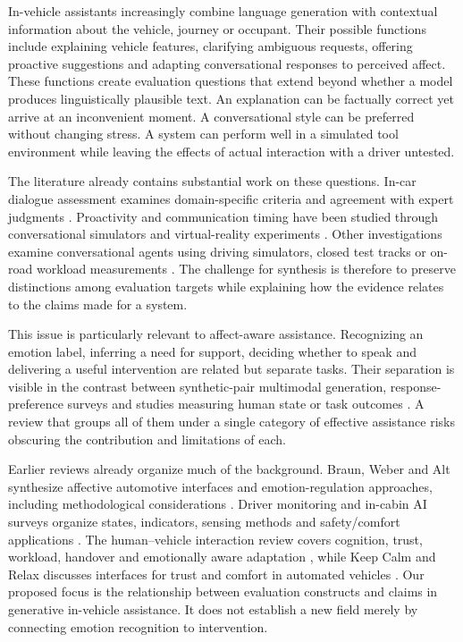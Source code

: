 \documentclass[11pt,a4paper]{article}
\begin{document}
In-vehicle assistants increasingly combine language generation with
contextual information about the vehicle, journey or occupant. Their
possible functions include explaining vehicle features, clarifying
ambiguous requests, offering proactive suggestions and adapting
conversational responses to perceived affect. These functions create
evaluation questions that extend beyond whether a model produces
linguistically plausible text. An explanation can be factually correct
yet arrive at an inconvenient moment. A conversational style can be
preferred without changing stress. A system can perform well in a
simulated tool environment while leaving the effects of actual
interaction with a driver untested.

The literature already contains substantial work on these questions.
In-car dialogue assessment examines domain-specific criteria and
agreement with expert judgments \citep{S14, S15}. Proactivity and
communication timing have been studied through conversational simulators
and virtual-reality experiments \citep{S9, S12, S13}. Other
investigations examine conversational agents using driving simulators,
closed test tracks or on-road workload measurements \citep{S4, S5, S6}.
The challenge for synthesis is therefore to preserve distinctions among
evaluation targets while explaining how the evidence relates to the
claims made for a system.

This issue is particularly relevant to affect-aware assistance.
Recognizing an emotion label, inferring a need for support, deciding
whether to speak and delivering a useful intervention are related but
separate tasks. Their separation is visible in the contrast between
synthetic-pair multimodal generation, response-preference surveys and
studies measuring human state or task outcomes \citep{S7, S11, S2, S5}.
A review that groups all of them under a single category of effective
assistance risks obscuring the contribution and limitations of each.

Earlier reviews already organize much of the background. Braun, Weber
and Alt synthesize affective automotive interfaces and
emotion-regulation approaches, including methodological considerations
\citep{R1}. Driver monitoring and in-cabin AI surveys organize states,
indicators, sensing methods and safety/comfort applications
\citep{R2, R5}. The human--vehicle interaction review covers cognition,
trust, workload, handover and emotionally aware adaptation \citep{R3},
while Keep Calm and Relax discusses interfaces for trust and comfort in
automated vehicles \citep{R6}. Our proposed focus is the relationship
between evaluation constructs and claims in generative in-vehicle
assistance. It does not establish a new field merely by connecting
emotion recognition to intervention.
\end{document}
